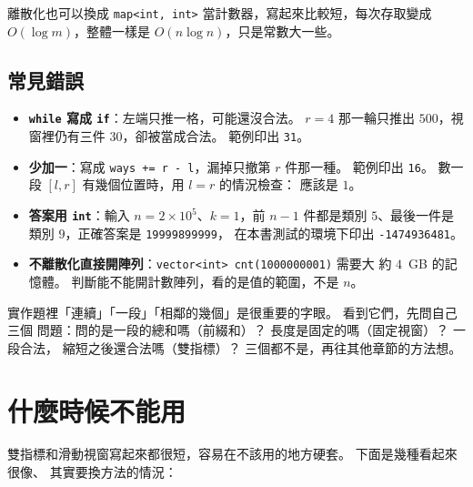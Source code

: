 離散化也可以換成 \texttt{map<int, int>} 當計數器，寫起來比較短，每次存取變成
$O(\log m)$，整體一樣是 $O(n \log n)$，只是常數大一些。

\subsection{常見錯誤}

\begin{itemize}
\item \textbf{\texttt{while} 寫成 \texttt{if}}：左端只推一格，可能還沒合法。
$r = 4$ 那一輪只推出 $500$，視窗裡仍有三件 $30$，卻被當成合法。 範例印出
\texttt{31}。
\item \textbf{少加一}：寫成 \texttt{ways += r - l}，漏掉只撤第 $r$ 件那一種。
範例印出 \texttt{16}。 數一段 $[l, r]$ 有幾個位置時，用 $l = r$ 的情況檢查：
應該是 $1$。
\item \textbf{答案用 \texttt{int}}：輸入 $n = 2 \times 10^5$、$k = 1$，前
$n - 1$ 件都是類別 $5$、最後一件是類別 $9$，正確答案是 \texttt{19999899999}，
在本書測試的環境下印出 \texttt{-1474936481}。
\item \textbf{不離散化直接開陣列}：\texttt{vector<int> cnt(1000000001)} 需要大
約 $4$~GB 的記憶體。 判斷能不能開計數陣列，看的是值的範圍，不是 $n$。
\end{itemize}

\begin{apcsnote}
實作題裡「連續」「一段」「相鄰的幾個」是很重要的字眼。 看到它們，先問自己三個
問題：問的是一段的總和嗎（前綴和）？ 長度是固定的嗎（固定視窗）？ 一段合法，
縮短之後還合法嗎（雙指標）？ 三個都不是，再往其他章節的方法想。
\end{apcsnote}

\section{什麼時候不能用}
\label{sec:ps-limits}

雙指標和滑動視窗寫起來都很短，容易在不該用的地方硬套。 下面是幾種看起來很像、
其實要換方法的情況：

